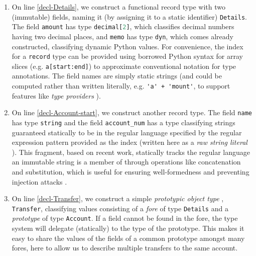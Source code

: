 \documentclass[9pt]{sigplanconf}
\newcommand{\lstinlinep}[1]{\lstinline[language=Python,basicstyle=\ttfamily\small,deletendkeywords={tuple,buffer,map}]{#1}}
\begin{document}
\begin{enumerate}
\item On line \ref{decl-Details}, we construct a functional record type with two (immutable) fields, naming it (by assigning it to a static identifier) \lstinlinep{Details}. The field \lstinlinep{amount} has type \lstinlinep{decimal[2]}, which classifies decimal numbers having two decimal places, and \lstinlinep{memo} has type \lstinlinep{dyn}, which comes already constructed, classifying dynamic Python values.  %
For convenience, the index for a \lstinlinep{record} type can be provided using borrowed Python  syntax for array slices (e.g. \lstinlinep{a[start:end]}) to approximate conventional notation for type annotations. The field names are simply static strings (and could be computed rather than written literally, e.g. \lstinline{'a' + 'mount'}, to support features like \emph{type providers} \cite{Syme:2013:TIF:2429376.2429378}). 
\item On line \ref{decl-Account-start}, we construct another record type. The field \lstinlinep{name} has type \lstinlinep{string} and the field \lstinlinep{account_num} has a type classifying strings guaranteed statically to be in the regular language specified  by the  regular expression pattern provided as the index (written here as a \emph{raw string literal} \cite{python}). This  fragment, based on recent work, statically tracks the regular language an immutable string is a member of through operations like concatenation and substitution, which is useful for ensuring well-formedness and preventing injection attacks \cite{sanitation-psp14}.%
\item 
On line \ref{decl-Transfer}, we construct a simple \emph{prototypic object type} \cite{Lie86}, \lstinlinep{Transfer}, classifying values consisting of a \emph{fore} of type \lstinlinep{Details} and a \emph{prototype} of type \lstinlinep{Account}. %
 If a field cannot be found in the fore, the type system will delegate (statically) to the type of the prototype. This makes it easy to share the values of the fields of a common prototype amongst many fores, here to allow us to describe multiple transfers to the same account.%
\end{enumerate}
\end{document}
